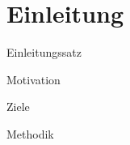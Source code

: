 \chapter{Einleitung} %
\label{ch:intro}

\noindent
Einleitungssatz



\noindent
Motivation


\noindent
Ziele


\noindent
Methodik
\cite{bundestag:2022}




